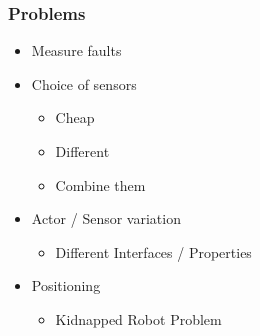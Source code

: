 \frame
{
\frametitle{Problems}

\begin{itemize}
\item Measure faults
\item Choice of sensors
	\begin{itemize}
	\item Cheap
	\item Different
	\item Combine them
	\end{itemize}
\item Actor / Sensor variation
	\begin{itemize}
	\item Different Interfaces / Properties
	\end{itemize}
\item Positioning
	\begin{itemize}
	\item Kidnapped Robot Problem
	\end{itemize}
\end{itemize}
}

